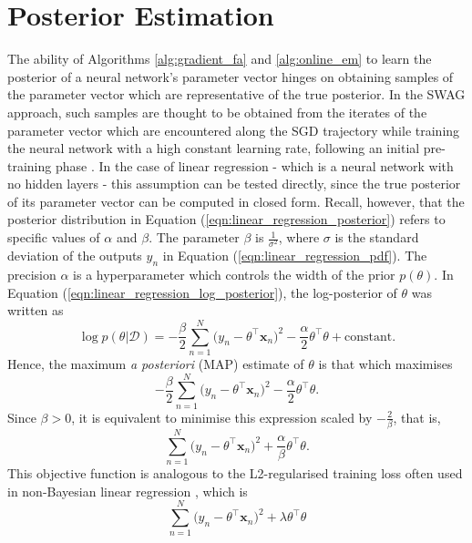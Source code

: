 \documentclass[msc,deptreport.inf]{infthesis} %
\newcommand{\matr}[1]{\mathbf{#1}}
\begin{document}
\section{Posterior Estimation}\label{sec:linear_regression_posterior_experiments}

The ability of Algorithms \ref{alg:gradient_fa} and \ref{alg:online_em} to learn the posterior of a neural network's parameter vector hinges on obtaining samples of the parameter vector which are representative of the true posterior. In the SWAG approach, such samples are thought to be obtained from the iterates of the parameter vector which are encountered along the SGD trajectory while training the neural network with a high constant learning rate, following an initial pre-training phase \cite{maddox2019}. In the case of linear regression - which is a neural network with no hidden layers - this assumption can be tested directly, since the true posterior of its parameter vector can be computed in closed form. Recall, however, that the posterior distribution in Equation (\ref{eqn:linear_regression_posterior}) refers to specific values of $\alpha$ and $\beta$. The parameter $\beta$ is $\frac{1}{\sigma^2}$, where $\sigma$ is the standard deviation of the outputs $y_n$ in Equation (\ref{eqn:linear_regression_pdf}). The precision $\alpha$ is a hyperparameter which controls the width of the prior $p(\theta)$. In Equation (\ref{eqn:linear_regression_log_posterior}), the log-posterior of $\theta$ was written as 
\begin{equation}
	\log p(\theta | \mathcal{D}) 
	= -\frac{\beta}{2} \sum_{n=1}^N \big(y_n - \theta^\intercal \matr{x}_n \big)^2 
	-\frac{\alpha}{2} \theta^\intercal \theta 
	+ \text{constant}.
\end{equation}
Hence, the maximum \emph{a posteriori} (MAP) estimate of $\theta$ is that which maximises
\begin{equation}
	-\frac{\beta}{2} \sum_{n=1}^N \big(y_n - \theta^\intercal \matr{x}_n \big)^2 
	-\frac{\alpha}{2} \theta^\intercal \theta.
\end{equation}
Since $\beta > 0$, it is equivalent to minimise this expression scaled by $-\frac{2}{\beta}$, that is,
\begin{equation}
	\sum_{n=1}^N \big(y_n - \theta^\intercal \matr{x}_n \big)^2 
	+ \frac{\alpha}{\beta} \theta^\intercal \theta.
\end{equation}
This objective function is analogous to the L2-regularised training loss often used in non-Bayesian linear regression \cite{barber2007}, which is 
\begin{equation}\label{eqn:regularised_linear_regression}
	\sum_{n=1}^N \big(y_n - \theta^\intercal \matr{x}_n \big)^2 
	+ \lambda \theta^\intercal \theta 
\end{equation}
\end{document}

